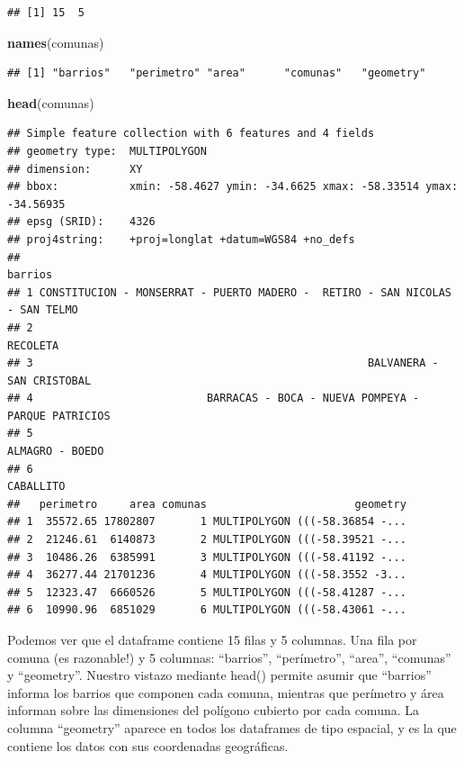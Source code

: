 \documentclass[]{book}
\newenvironment{Shaded}{\begin{snugshade}}{\end{snugshade}}
\newcommand{\KeywordTok}[1]{\textcolor[rgb]{0.13,0.29,0.53}{\textbf{#1}}}
\newcommand{\NormalTok}[1]{#1}
\begin{document}
\begin{verbatim}
## [1] 15  5
\end{verbatim}

\begin{Shaded}
\begin{Highlighting}[]
\KeywordTok{names}\NormalTok{(comunas)}
\end{Highlighting}
\end{Shaded}

\begin{verbatim}
## [1] "barrios"   "perimetro" "area"      "comunas"   "geometry"
\end{verbatim}

\begin{Shaded}
\begin{Highlighting}[]
\KeywordTok{head}\NormalTok{(comunas)}
\end{Highlighting}
\end{Shaded}

\begin{verbatim}
## Simple feature collection with 6 features and 4 fields
## geometry type:  MULTIPOLYGON
## dimension:      XY
## bbox:           xmin: -58.4627 ymin: -34.6625 xmax: -58.33514 ymax: -34.56935
## epsg (SRID):    4326
## proj4string:    +proj=longlat +datum=WGS84 +no_defs
##                                                                        barrios
## 1 CONSTITUCION - MONSERRAT - PUERTO MADERO -  RETIRO - SAN NICOLAS - SAN TELMO
## 2                                                                     RECOLETA
## 3                                                    BALVANERA - SAN CRISTOBAL
## 4                           BARRACAS - BOCA - NUEVA POMPEYA - PARQUE PATRICIOS
## 5                                                              ALMAGRO - BOEDO
## 6                                                                    CABALLITO
##   perimetro     area comunas                       geometry
## 1  35572.65 17802807       1 MULTIPOLYGON (((-58.36854 -...
## 2  21246.61  6140873       2 MULTIPOLYGON (((-58.39521 -...
## 3  10486.26  6385991       3 MULTIPOLYGON (((-58.41192 -...
## 4  36277.44 21701236       4 MULTIPOLYGON (((-58.3552 -3...
## 5  12323.47  6660526       5 MULTIPOLYGON (((-58.41287 -...
## 6  10990.96  6851029       6 MULTIPOLYGON (((-58.43061 -...
\end{verbatim}

Podemos ver que el dataframe contiene 15 filas y 5 columnas. Una fila
por comuna (es razonable!) y 5 columnas: ``barrios'', ``perímetro'',
``area'', ``comunas'' y ``geometry''. Nuestro vistazo mediante head()
permite asumir que ``barrios'' informa los barrios que componen cada
comuna, mientras que perímetro y área informan sobre las dimensiones del
polígono cubierto por cada comuna. La columna ``geometry'' aparece en
todos los dataframes de tipo espacial, y es la que contiene los datos
con sus coordenadas geográficas.
\end{document}
